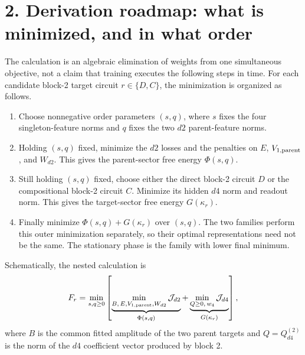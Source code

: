 \documentclass[10pt]{article}
\begin{document}
\section*{2. Derivation roadmap: what is minimized, and in what order}
The calculation is an algebraic elimination of weights from one simultaneous objective, not a
claim that training executes the following steps in time.  For each candidate block-2 target
circuit $r\in\{D,C\}$, the minimization is organized as follows.
\begin{enumerate}
\item Choose nonnegative order parameters $(s,q)$, where $s$ fixes the four singleton-feature
norms and $q$ fixes the two $d2$ parent-feature norms.
\item Holding $(s,q)$ fixed, minimize the $d2$ losses and the penalties on $E$,
$V_{1,\rm parent}$, and $W_{d2}$.  This gives the parent-sector free energy $\Phi(s,q)$.
\item Still holding $(s,q)$ fixed, choose either the direct block-2 circuit $D$ or the
compositional block-2 circuit $C$.  Minimize its hidden $d4$ norm and readout norm.  This gives
the target-sector free energy $G(\kappa_r)$.
\item Finally minimize $\Phi(s,q)+G(\kappa_r)$ over $(s,q)$.  The two families perform this
outer minimization separately, so their optimal representations need not be the same.  The
stationary phase is the family with lower final minimum.
\end{enumerate}
Schematically, the nested calculation is
\begin{equation}
F_r=\min_{s,q\geq0}\left[
\underbrace{\min_{B,\,E,V_{1,\rm parent},W_{d2}}\mathcal J_{d2}}_{\Phi(s,q)}+
\underbrace{\min_{Q\geq0,\,w_4}\mathcal J_{d4}}_{G(\kappa_r)}
\right],
\label{eq:roadmap}
\end{equation}
where $B$ is the common fitted amplitude of the two parent targets and
$Q=Q_{d4}^{(2)}$ is the norm of the $d4$ coefficient vector produced by block 2.
\end{document}
